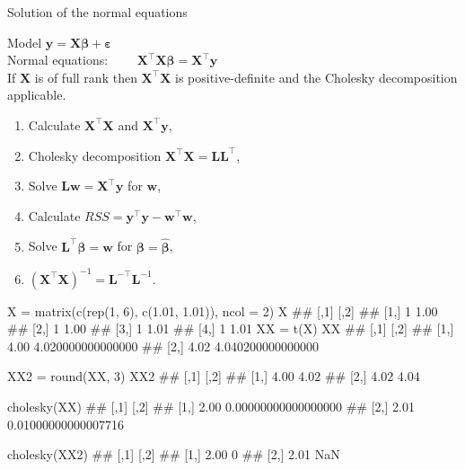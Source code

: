 \begin{vbframe}{Solution of the normal equations}

Model $\mathbf{y} = \mathbf{X}\boldsymbol{\beta} + \boldsymbol{\varepsilon}$\\
\medskip
Normal equations: $ \qquad \mathbf{X}^\top\mathbf{X}\boldsymbol{\beta} = \mathbf{X}^\top\mathbf{y}$\\
\medskip
If $\mathbf{X}$ is of full rank then $\mathbf{X}^\top\mathbf{X}$ is positive-definite and the Cholesky decomposition applicable.

\begin{enumerate}
\item Calculate $\mathbf{X}^\top\mathbf{X}$ and $\mathbf{X}^\top\mathbf{y}$,
\item Cholesky decomposition $\mathbf{X}^\top\mathbf{X} = \mathbf{LL}^\top$,
\item Solve $\mathbf{Lw} = \mathbf{X}^\top\mathbf{y}$ for $\mathbf{w}$,
\item Calculate $RSS = \mathbf{y}^\top\mathbf{y} - \mathbf{w}^\top\mathbf{w}$,
\item Solve $\mathbf{L}^\top\boldsymbol{\beta} = \mathbf{w}$ for $\boldsymbol{\beta} = \hat{\boldsymbol{\beta}}$,
\item $(\mathbf{X}^\top\mathbf{X})^{-1} = \mathbf{L}^{-\top}\mathbf{L}^{-1}$.
\end{enumerate}

\framebreak
\footnotesize
\begin{verbbox}
X = matrix(c(rep(1, 6), c(1.01, 1.01)), ncol = 2)
X
## [,1] [,2]
## [1,] 1 1.00
## [2,] 1 1.00
## [3,] 1 1.01
## [4,] 1 1.01
XX = t(X) %
XX
## [,1] [,2]
## [1,] 4.00 4.020000000000000
## [2,] 4.02 4.040200000000000
\end{verbbox}
\col

\framebreak
\begin{verbbox}
XX2 = round(XX, 3)
XX2
## [,1] [,2]
## [1,] 4.00 4.02
## [2,] 4.02 4.04
\end{verbbox}
\col
\vspace{0.2cm}
\begin{verbbox}
cholesky(XX)
## [,1] [,2]
## [1,] 2.00 0.00000000000000000
## [2,] 2.01 0.01000000000007716
\end{verbbox}
\col
\vspace{0.2cm}
\begin{verbbox}
cholesky(XX2)
## [,1] [,2]
## [1,] 2.00 0
## [2,] 2.01 NaN
\end{verbbox}
\col


\end{vbframe}
